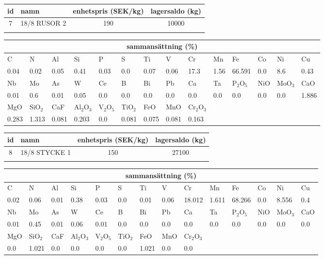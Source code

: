 \begin{center}
{\scriptsize\addtolength{\tabcolsep}{-3pt}
\begin{tabular}{clcc}
id&namn&enhetspris (SEK/kg)&lagersaldo (kg)\\
\hline
7&18/8 RUSOR 2&190&10000\\\\
\end{tabular}
\begin{tabular}{llllllllllllll}
\multicolumn{14}{c}{sammansättning (\%)}\\
\hline
C&N&Al&Si&P&S&Ti&V&Cr&Mn&Fe&Co&Ni&Cu\\
\hline
0.04&0.02&0.05&0.41& 0.03&0.0&0.07&0.06& 17.3&1.56&66.591&0.0& 8.6&0.43\\
\hline
Nb&Mo&As&W&Ce&B&Bi&Pb&Ca&Ta&P$_2$O$_5$&NiO&MoO$_3$&CaO\\
\hline
0.01& 0.6& 0.01& 0.05& 0.0& 0.0& 0.0& 0.0& 0.0& 0.0& 0.0& 0.0& 0.0& 1.886\\
\hline
MgO&SiO$_2$&CaF&Al$_2$O$_3$&V$_2$O$_5$&TiO$_2$&FeO&MnO&Cr$_2$O$_3$\\
\hline
0.283& 1.313& 0.081& 0.203& 0.0& 0.081& 0.075& 0.081& 0.163\\
\end{tabular}
}
\end{center}

\begin{center}
{\scriptsize\addtolength{\tabcolsep}{-3pt}
\begin{tabular}{clcc}
id&namn&enhetspris (SEK/kg)&lagersaldo (kg)\\
\hline
8&18/8 STYCKE 1&150&27100\\\\
\end{tabular}
\begin{tabular}{llllllllllllll}
\multicolumn{14}{c}{sammansättning (\%)}\\
\hline
C&N&Al&Si&P&S&Ti&V&Cr&Mn&Fe&Co&Ni&Cu\\
\hline
0.02&0.06&0.01&0.38& 0.03&0.0&0.01&0.06& 18.012&1.611&68.266&0.0& 8.556&0.4\\
\hline
Nb&Mo&As&W&Ce&B&Bi&Pb&Ca&Ta&P$_2$O$_5$&NiO&MoO$_3$&CaO\\
\hline
0.01& 0.45& 0.01& 0.06& 0.01& 0.0& 0.0& 0.0& 0.0& 0.0& 0.0& 0.0& 0.0& 0.0\\
\hline
MgO&SiO$_2$&CaF&Al$_2$O$_3$&V$_2$O$_5$&TiO$_2$&FeO&MnO&Cr$_2$O$_3$\\
\hline
0.0& 1.021& 0.0& 0.0& 0.0& 0.0& 1.021& 0.0& 0.0\\
\end{tabular}
}
\end{center}

